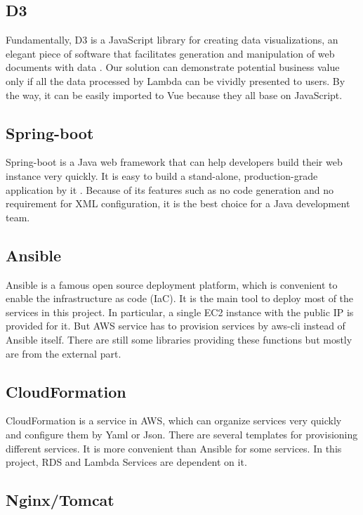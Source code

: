 \documentclass[conference]{IEEEtran}
\begin{document}
\subsection{D3}

Fundamentally, D3 is a JavaScript library for creating data visualizations, an elegant piece of software that facilitates 
generation and manipulation of web documents with data \cite{2013Interactive}. Our solution can demonstrate potential business 
value only if all the data processed by Lambda can be vividly presented to users. By the way, it can be easily imported to 
Vue because they all base on JavaScript.
 
\subsection{Spring-boot}

Spring-boot is a Java web framework that can help developers build their web instance very quickly. It is easy to build a 
stand-alone, production-grade application by it \cite{SpringBo66:online}. Because of its features such as no code generation 
and no requirement for XML configuration, it is the best choice for a Java development team.

\subsection{Ansible}

Ansible is a famous open source deployment platform, which is convenient to enable the infrastructure as code (IaC). 
It is the main tool to deploy most of the services in this project. In particular, a single EC2 instance with the public 
IP is provided for it. But AWS service has to provision services by aws-cli instead of Ansible itself. There are still 
some libraries providing these functions but mostly are from the external part.

\subsection{CloudFormation}

CloudFormation is a service in AWS, which can organize services very quickly and configure them by Yaml or Json. There are
several templates for provisioning different services. It is more convenient than Ansible for some services. In this project, 
RDS and Lambda Services are dependent on it.

\subsection{Nginx/Tomcat}
\end{document}
